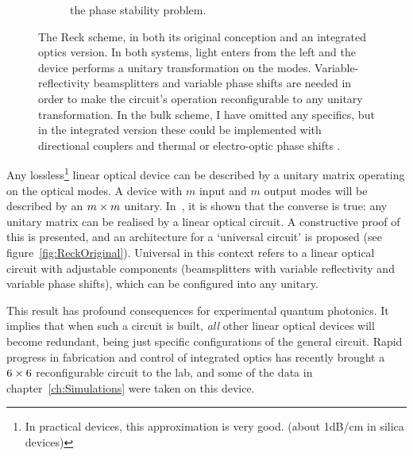 \begin{figure}[p]
\begin{subfigure}{\textwidth}
{    the phase stability problem.}
    \label{fig:ReckGeneral}
  \end{subfigure}
  \caption[The Reck scheme, in both its original conception and an integrated
  optics version]{The Reck scheme, in both its original conception and an
  integrated
  optics version. In both systems, light enters from the left and the device
  performs a unitary transformation on the modes. Variable-reflectivity
  beamsplitters and variable phase shifts are needed in order to make the
  circuit's operation reconfigurable to any unitary transformation. In the
  bulk scheme, I have omitted any specifics, but in the integrated version these
  could be implemented with directional couplers and thermal or electro-optic
  phase shifts \cite{peteschip}.}
  \label{fig:ReckScheme}
\end{figure}
Any lossless\footnote{In practical devices, this approximation is very good.
(about 1dB/cm in silica devices)} linear optical device can be
described by a unitary matrix operating on the optical modes. A device with
\(m\) input and \(m\) output modes will be described by an \(m \times m\) unitary.
In~\cite{reck}, it is shown that the converse is true: any unitary matrix can
be realised by a linear optical circuit. A constructive proof of this is
presented, and an architecture for a `universal circuit' is proposed (see
figure~\ref{fig:ReckOriginal}). Universal in this context refers to a linear
optical circuit with adjustable components (beamsplitters with variable
reflectivity and variable phase shifts), which can be configured into any
unitary.

This result has profound consequences for experimental quantum photonics.
It implies that when such a circuit is built, \emph{all} other linear optical
devices will become redundant, being just specific configurations of the
general circuit. Rapid progress in fabrication and control of integrated optics
has recently brought a \(6 \times 6\) reconfigurable circuit to the lab, and some
of the data in chapter~\ref{ch:Simulations} were taken on this device.


